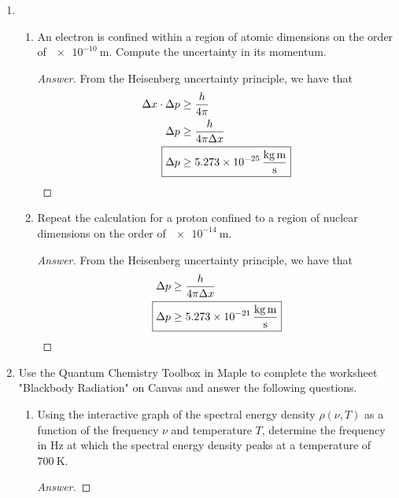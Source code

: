 \documentclass[../psets.tex]{subfiles}
\begin{document}
\begin{enumerate}
\begin{enumerate}
        \begin{proof}[Answer]
            No --- the Bohr model is only valid for single electron systems as it does not take into account electron-electron interactions.
        \end{proof}
    \end{enumerate}
    \item 
    \begin{enumerate}
        \item An electron is confined within a region of atomic dimensions on the order of $\SI{e-10}{\meter}$. Compute the uncertainty in its momentum.
        \begin{proof}[Answer]
            From the Heisenberg uncertainty principle, we have that
            \begin{align*}
                \Delta x\cdot\Delta p &\geq \frac{h}{4\pi}\\
                \Delta p &\geq \frac{h}{4\pi\Delta x}\\
                \Aboxed{\Delta p &\geq \SI[per-mode=fraction]{5.273e-25}{\kilo\gram\meter\per\second}}
            \end{align*}
        \end{proof}
        \item Repeat the calculation for a proton confined to a region of nuclear dimensions on the order of $\SI{e-14}{\meter}$.
        \begin{proof}[Answer]
            From the Heisenberg uncertainty principle, we have that
            \begin{align*}
                \Delta p &\geq \frac{h}{4\pi\Delta x}\\
                \Aboxed{\Delta p &\geq \SI[per-mode=fraction]{5.273e-21}{\kilo\gram\meter\per\second}}
            \end{align*}
        \end{proof}
    \end{enumerate}
    \item Use the Quantum Chemistry Toolbox in Maple to complete the worksheet "Blackbody Radiation" on Canvas and answer the following questions.
    \begin{enumerate}
        \item Using the interactive graph of the spectral energy density $\rho(\nu,T)$ as a function of the frequency $\nu$ and temperature $T$, determine the frequency in $\si{\hertz}$ at which the spectral energy density peaks at a temperature of $\SI{700}{\kelvin}$.
        \begin{proof}[Answer]

\end{proof}
\end{enumerate}
\end{enumerate}
\end{document}
